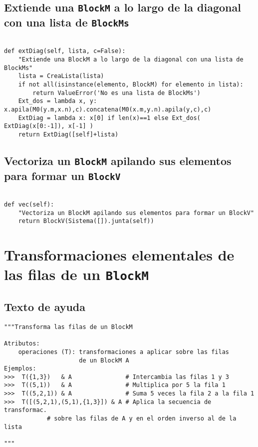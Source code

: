 \documentclass[11pt]{report}
\begin{document}
\subsection{Extiende una \texttt{BlockM} a lo largo de la diagonal con una lista de \texttt{BlockMs}}
\label{sec:org58a3f50}

\begin{verbatim}
   
def extDiag(self, lista, c=False):
    "Extiende una BlockM a lo largo de la diagonal con una lista de BlockMs"
    lista = CreaLista(lista)
    if not all(isinstance(elemento, BlockM) for elemento in lista): 
        return ValueError('No es una lista de BlockMs')
    Ext_dos = lambda x, y: x.apila(M0(y.m,x.n),c).concatena(M0(x.m,y.n).apila(y,c),c)
    ExtDiag = lambda x: x[0] if len(x)==1 else Ext_dos( ExtDiag(x[0:-1]), x[-1] )
    return ExtDiag([self]+lista)

\end{verbatim}

\subsection{Vectoriza un \texttt{BlockM} apilando sus elementos para formar un \texttt{BlockV}}
\label{sec:orgd7575f9}
\begin{verbatim}
   
def vec(self):
    "Vectoriza un BlockM apilando sus elementos para formar un BlockV"
    return BlockV(Sistema([]).junta(self))

\end{verbatim}

\section{Transformaciones elementales de las filas de un \texttt{BlockM}}
\label{sec:org8a92720}

\subsection{Texto de ayuda}
\label{sec:orgcd42e13}

\begin{verbatim}
"""Transforma las filas de un BlockM

Atributos:
    operaciones (T): transformaciones a aplicar sobre las filas
                     de un BlockM A
Ejemplos:
>>>  T({1,3})   & A               # Intercambia las filas 1 y 3
>>>  T((5,1))   & A               # Multiplica por 5 la fila 1
>>>  T((5,2,1)) & A               # Suma 5 veces la fila 2 a la fila 1
>>>  T([(5,2,1),(5,1),{1,3}]) & A # Aplica la secuencia de transformac.
            # sobre las filas de A y en el orden inverso al de la lista

"""
\end{verbatim}
\end{document}

